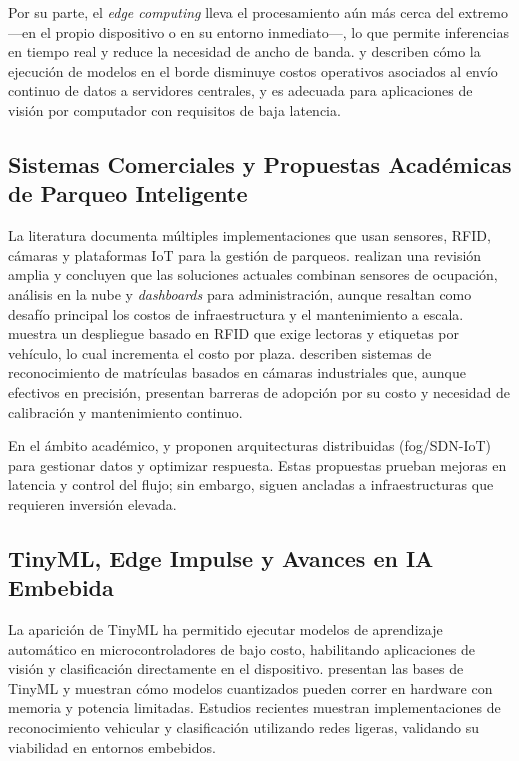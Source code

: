 \documentclass[12pt, letterpaper]{article}
\begin{document}
Por su parte, el \textit{edge computing} lleva el procesamiento aún más cerca del extremo —en el propio dispositivo o en su entorno inmediato—, lo que permite inferencias en tiempo real y reduce la necesidad de ancho de banda. \textcite{satyanarayanan2017edge} y \textcite{zheng2025iot} describen cómo la ejecución de modelos en el borde disminuye costos operativos asociados al envío continuo de datos a servidores centrales, y es adecuada para aplicaciones de visión por computador con requisitos de baja latencia.

\subsection{Sistemas Comerciales y Propuestas Académicas de Parqueo Inteligente}
La literatura documenta múltiples implementaciones que usan sensores, RFID, cámaras y plataformas IoT para la gestión de parqueos. \textcite{alam2023survey} realizan una revisión amplia y concluyen que las soluciones actuales combinan sensores de ocupación, análisis en la nube y \textit{dashboards} para administración, aunque resaltan como desafío principal los costos de infraestructura y el mantenimiento a escala. \textcite{olivares2011rfid} muestra un despliegue basado en RFID que exige lectoras y etiquetas por vehículo, lo cual incrementa el costo por plaza. \textcite{valeo2020patentes} describen sistemas de reconocimiento de matrículas basados en cámaras industriales que, aunque efectivos en precisión, presentan barreras de adopción por su costo y necesidad de calibración y mantenimiento continuo.

En el ámbito académico, \textcite{celaya2020fog} y \textcite{marshoodulla2024sdiotpark} proponen arquitecturas distribuidas (fog/SDN-IoT) para gestionar datos y optimizar respuesta. Estas propuestas prueban mejoras en latencia y control del flujo; sin embargo, siguen ancladas a infraestructuras que requieren inversión elevada.

\subsection{TinyML, Edge Impulse y Avances en IA Embebida}
La aparición de TinyML ha permitido ejecutar modelos de aprendizaje automático en microcontroladores de bajo costo, habilitando aplicaciones de visión y clasificación directamente en el dispositivo. \textcite{warden2020tinyml} presentan las bases de TinyML y muestran cómo modelos cuantizados pueden correr en hardware con memoria y potencia limitadas. Estudios recientes \parencite{tinyml2022EdgeImpulse, zheng2025iot} muestran implementaciones de reconocimiento vehicular y clasificación utilizando redes ligeras, validando su viabilidad en entornos embebidos.
\end{document}
